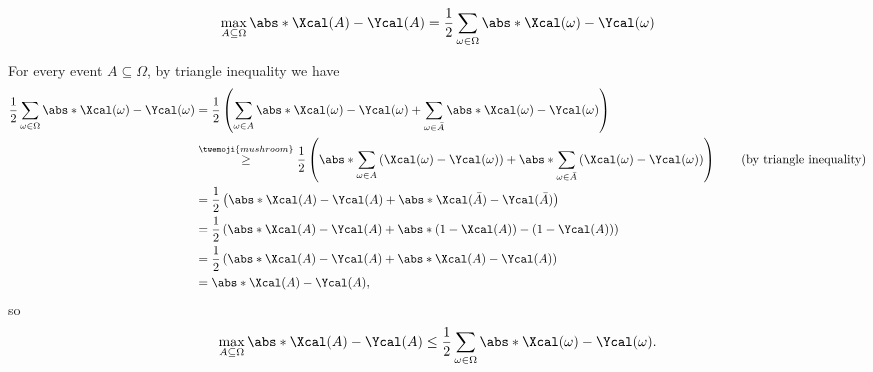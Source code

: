 \begin{answer}[i]
    \leavevmode\par
    \begin{goal}
    \[
        \max_{A\subseteq \Omega}\abs*{\Xcal(A)-\Ycal(A)} = \frac{1}{2}\sum_{\omega\in\Omega}\abs*{\Xcal(\omega)-\Ycal(\omega)}
    \]
    \end{goal}
    For every event $A\subseteq \Omega$, by triangle inequality we have
    \begin{align*}
        \frac{1}{2}\sum_{\omega\in\Omega}\abs*{\Xcal(\omega)-\Ycal(\omega)}
        &= \frac{1}{2}\left(\sum_{\omega\in A}\abs*{\Xcal(\omega)-\Ycal(\omega)}+\sum_{\omega\in \bar{A}}\abs*{\Xcal(\omega)-\Ycal(\omega)} \right)\\
        &\stackrel{\twemoji{mushroom}}{\ge} \frac{1}{2}\left(\abs*{\sum_{\omega\in A}\left(\Xcal(\omega)-\Ycal(\omega)\right)}+\abs*{ \sum_{\omega\in \bar{A}}\left(\Xcal(\omega)-\Ycal(\omega) \right)} \right)
        \qquad (\textrm{by triangle inequality})\\
        &= \frac{1}{2}\left(\abs*{\Xcal(A)-\Ycal(A)}+\abs*{\Xcal(\bar{A})-\Ycal(\bar{A})} \right)\\
        &= \frac{1}{2}\left(\abs*{\Xcal(A)-\Ycal(A)}+\abs*{(1-\Xcal(A))-(1-\Ycal(A))} \right)\\
        &= \frac{1}{2}\left(\abs*{\Xcal(A)-\Ycal(A)}+\abs*{\Xcal(A)-\Ycal(A)} \right)\\
        &= \abs*{\Xcal(A)-\Ycal(A)},
    \end{align*}
    so
    \begin{equation}\label{eq:p1-1-1}
        \max_{A\subseteq \Omega}\abs*{\Xcal(A)-\Ycal(A)} \le  \frac{1}{2}\sum_{\omega\in\Omega}\abs*{\Xcal(\omega)-\Ycal(\omega)}.
    \end{equation}


\end{answer}
